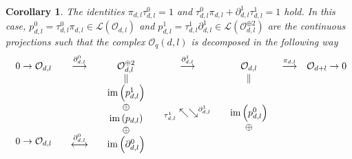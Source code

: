 \documentclass[10pt,a4paper]{amsart}
\newtheorem{corollary}{Corollary}
\begin{document}
\begin{corollary}
\label{corDecom}The identities $\pi_{d,l}\tau_{d,l}^{0}=1$ and $\tau_{d,l}%
^{0}\pi_{d,l}+\partial_{d,l}^{1}\tau_{d,l}^{1}=1$ hold. In this case,
$p_{d,l}^{0}=\tau_{d,l}^{0}\pi_{d,l}\in\mathcal{L}\left(  \mathcal{O}%
_{d,l}\right)  $ and $p_{d,l}^{1}=\tau_{d,l}^{1}\partial_{d,l}^{1}%
\in\mathcal{L}\left(  \mathcal{O}_{d,l}^{\oplus2}\right)  $ are the continuous
projections such that the complex $\mathcal{O}_{q}\left(  d,l\right)  $ is
decomposed in the following way
\[%
\begin{array}
[c]{ccccccc}%
0\rightarrow\mathcal{O}_{d,l} & \overset{\partial_{d,l}^{0}}{\longrightarrow}
& \mathcal{O}_{d,l}^{\oplus2} & \overset{\partial_{d,l}^{1}}{\longrightarrow}
& \mathcal{O}_{d,l} & \overset{\pi_{d,l}}{\longrightarrow} & \mathcal{O}%
_{d+l}\rightarrow0\\
&  & \parallel &  & \parallel &  & \\%
\begin{array}
[c]{c}%
\\
\\
\\
\\
0\rightarrow\mathcal{O}_{d,l}%
\end{array}
&
\begin{array}
[c]{c}%
\\
\\
\\
\\
\overset{\partial_{d,l}^{0}}{\longleftrightarrow}%
\end{array}
&
\begin{array}
[c]{c}%
\operatorname{im}\left(  p_{d,l}^{1}\right) \\
\oplus\\
\operatorname{im}\left(  p_{d,l}\right) \\
\oplus\\
\operatorname{im}\left(  \partial_{d,l}^{0}\right)
\end{array}
&
\begin{array}
[c]{c}%
\\
_{\tau_{d,l}^{1}}\nwarrow\searrow^{\partial_{d,l}^{1}}\\
\\
\\
\end{array}
&
\begin{array}
[c]{c}%
\operatorname{im}\left(  p_{d,l}^{0}\right) \\
\oplus\\

\end{array}
\end{array}\]
\end{corollary}
\end{document}
